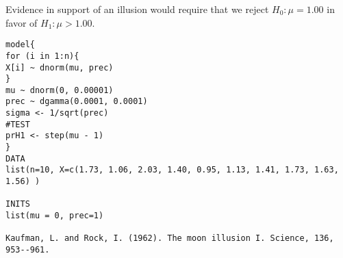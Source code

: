 \documentclass[12pt]{article}
\begin{document}
Evidence in support of an illusion would require that we
reject $H_0: \mu = 1.00 $ in favor of $H_1: \mu > 1.00.$

\begin{verbatim}
model{
for (i in 1:n){
X[i] ~ dnorm(mu, prec)
}
mu ~ dnorm(0, 0.00001)
prec ~ dgamma(0.0001, 0.0001)
sigma <- 1/sqrt(prec)
#TEST
prH1 <- step(mu - 1)
}
DATA
list(n=10, X=c(1.73, 1.06, 2.03, 1.40, 0.95, 1.13, 1.41, 1.73, 1.63, 1.56) )

INITS
list(mu = 0, prec=1)

Kaufman, L. and Rock, I. (1962). The moon illusion I. Science, 136, 953--961.
\end{verbatim}
\end{document}

